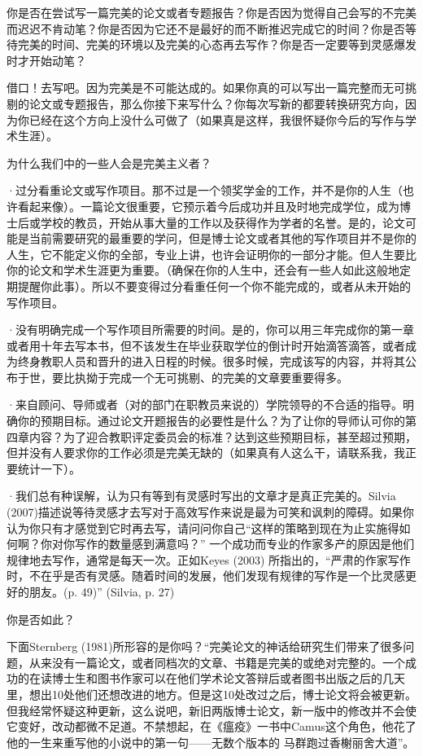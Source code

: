 \documentclass{ctexart}
\begin{document}
你是否在尝试写一篇完美的论文或者专题报告？你是否因为觉得自己会写的不完美而迟迟不肯动笔？你是否因为它还不是最好的而不断推迟完成它的时间？你是否等待完美的时间、完美的环境以及完美的心态再去写作？你是否一定要等到灵感爆发时才开始动笔？

借口！去写吧。因为完美是不可能达成的。如果你真的可以写出一篇完整而无可挑剔的论文或专题报告，那么你接下来写什么？你每次写新的都要转换研究方向，因为你已经在这个方向上没什么可做了（如果真是这样，我很怀疑你今后的写作与学术生涯）。

为什么我们中的一些人会是完美主义者？

·过分看重论文或写作项目。那不过是一个领奖学金的工作，并不是你的人生（也许看起来像）。一篇论文很重要，它预示着今后成功并且及时地完成学位，成为博士后或学校的教员，开始从事大量的工作以及获得作为学者的名誉。是的，论文可能是当前需要研究的最重要的学问，但是博士论文或者其他的写作项目并不是你的人生，它不能定义你的全部，专业上讲，也许会证明你的一部分才能。但人生要比你的论文和学术生涯更为重要。（确保在你的人生中，还会有一些人如此这般地定期提醒你此事）。所以不要变得过分看重任何一个你不能完成的，或者从未开始的写作项目。

·没有明确完成一个写作项目所需要的时间。是的，你可以用三年完成你的第一章或者用十年去写本书，但不该发生在毕业获取学位的倒计时开始滴答滴答，或者成为终身教职人员和晋升的进入日程的时候。很多时候，完成该写的内容，并将其公布于世，要比执拗于完成一个无可挑剔、的完美的文章要重要得多。

·来自顾问、导师或者（对的部门在职教员来说的）学院领导的不合适的指导。明确你的预期目标。通过论文开题报告的必要性是什么？为了让你的导师认可你的第四章内容？为了迎合教职评定委员会的标准？达到这些预期目标，甚至超过预期，但并没有人要求你的工作必须是完美无缺的（如果真有人这么干，请联系我，我正要统计一下）。

·我们总有种误解，认为只有等到有灵感时写出的文章才是真正完美的。Silvia (2007)描述说等待灵感才去写对于高效写作来说是最为可笑和讽刺的障碍。如果你认为你只有才感觉到它时再去写，请问问你自己“这样的策略到现在为止实施得如何啊？你对你写作的数量感到满意吗？” 一个成功而专业的作家多产的原因是他们规律地去写作，通常是每天一次。正如Keyes (2003) 所指出的，“严肃的作家写作时，不在乎是否有灵感。随着时间的发展，他们发现有规律的写作是一个比灵感更好的朋友。(p. 49)” (Silvia, p. 27)

你是否如此？

下面Sternberg (1981)所形容的是你吗？“完美论文的神话给研究生们带来了很多问题，从来没有一篇论文，或者同档次的文章、书籍是完美的或绝对完整的。一个成功的在读博士生和图书作家可以在他们学术论文答辩后或者图书出版之后的几天里，想出10处他们还想改进的地方。但是这10处改过之后，博士论文将会被更新。但我经常怀疑这种更新，这么说吧，新旧两版博士论文，新一版中的修改并不会使它变好，改动都微不足道。不禁想起，在《瘟疫》一书中Camus这个角色，他花了他的一生来重写他的小说中的第一句——无数个版本的 马群跑过香榭丽舍大道”。
\end{document}
